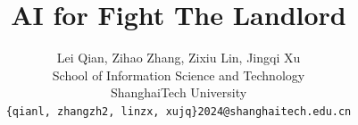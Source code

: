 \documentclass[letterpaper]{article}
\begin{document}
%
\title{AI for Fight The Landlord}
\author{Lei Qian, Zihao Zhang, Zixiu Lin, Jingqi Xu\\
School of Information Science and Technology\\
ShanghaiTech University\\
{\tt\small \{qianl, zhangzh2, linzx, xujq\}2024@shanghaitech.edu.cn}\\
}
\maketitle








\end{document}
